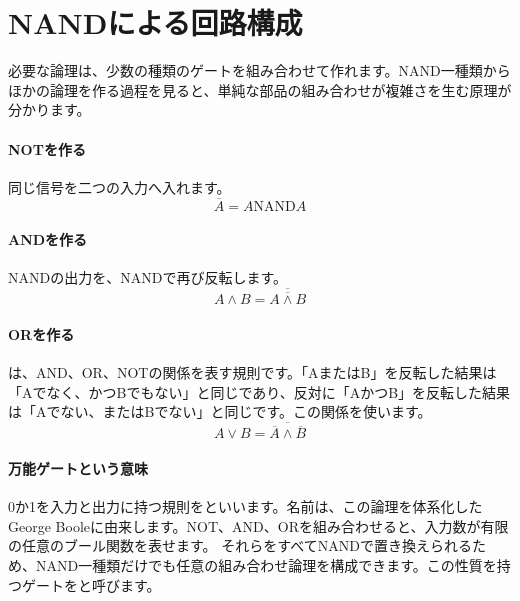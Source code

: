 \par
\endgroup
\par
\endgroup


\section{NANDによる回路構成}
\label{sec:01-digital-computer-07}

必要な論理は、少数の種類のゲートを組み合わせて作れます。NAND一種類からほかの論理を作る過程を見ると、単純な部品の組み合わせが複雑さを生む原理が分かります。

\begingroup
\begingroup
\paragraph{NOTを作る}
        同じ信号を二つの入力へ入れます。
        \[
          \overline{A}=A\mathbin{\mathrm{NAND}}A
        \]

\paragraph{ANDを作る}
        NANDの出力を、NANDで再び反転します。
        \[
          A\land B=\overline{\overline{A\land B}}
        \]

\par
\endgroup
\medskip
\begingroup
\paragraph{ORを作る}
        は、AND、OR、NOTの関係を表す規則です。「AまたはB」を反転した結果は「Aでなく、かつBでもない」と同じであり、反対に「AかつB」を反転した結果は「Aでない、またはBでない」と同じです。この関係を使います。
        \[
          A\lor B=\overline{\overline{A}\land\overline{B}}
        \]

\paragraph{万能ゲートという意味}
        0か1を入力と出力に持つ規則をといいます。名前は、この論理を体系化したGeorge Booleに由来します。NOT、AND、ORを組み合わせると、入力数が有限の任意のブール関数を表せます。
        それらをすべてNANDで置き換えられるため、NAND一種類だけでも任意の組み合わせ論理を構成できます。この性質を持つゲートをと呼びます。

\par
\endgroup
\par
\endgroup


